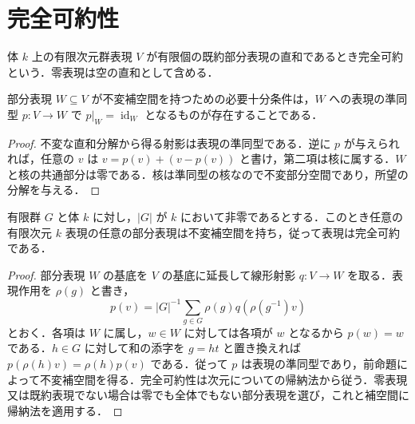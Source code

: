\section{完全可約性}
\begin{defn}[完全可約表現]
体 $k$ 上の有限次元群表現 $V$ が有限個の既約部分表現の直和であるとき完全可約という．零表現は空の直和として含める．
\end{defn}
\begin{prop}[不変補空間と分裂]
部分表現 $W\subseteq V$ が不変補空間を持つための必要十分条件は，$W$ への表現の準同型 $p:V\to W$ で $p|_W=\operatorname{id}_W$ となるものが存在することである．
\end{prop}
\begin{proof}
不変な直和分解から得る射影は表現の準同型である．逆に $p$ が与えられれば，任意の $v$ は $v=p(v)+(v-p(v))$ と書け，第二項は核に属する．$W$ と核の共通部分は零である．核は準同型の核なので不変部分空間であり，所望の分解を与える．
\end{proof}
\begin{prop}[Maschkeの定理]
有限群 $G$ と体 $k$ に対し，$|G|$ が $k$ において非零であるとする．このとき任意の有限次元 $k$ 表現の任意の部分表現は不変補空間を持ち，従って表現は完全可約である．
\end{prop}
\begin{proof}
部分表現 $W$ の基底を $V$ の基底に延長して線形射影 $q:V\to W$ を取る．表現作用を $\rho(g)$ と書き，
\[
p(v)=|G|^{-1}\sum_{g\in G}\rho(g)q(\rho(g^{-1})v)
\]
とおく．各項は $W$ に属し，$w\in W$ に対しては各項が $w$ となるから $p(w)=w$ である．$h\in G$ に対して和の添字を $g=ht$ と置き換えれば $p(\rho(h)v)=\rho(h)p(v)$ である．従って $p$ は表現の準同型であり，前命題によって不変補空間を得る．完全可約性は次元についての帰納法から従う．零表現又は既約表現でない場合は零でも全体でもない部分表現を選び，これと補空間に帰納法を適用する．
\end{proof}
